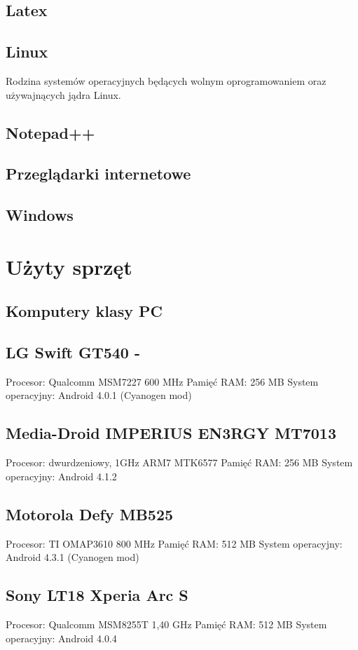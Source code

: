 \documentclass[11pt,a4paper,polish,thesis]{dcsbook}
\begin{document}
\subsection{Latex}

\subsection{Linux}
Rodzina systemów operacyjnych będących wolnym oprogramowaniem oraz używajnących jądra Linux.
\subsection{Notepad++}
\subsection{Przeglądarki internetowe}
\subsection{Windows}
\section{Użyty sprzęt}

\subsection{Komputery klasy PC}
\subsection{LG Swift GT540 - }
Procesor: Qualcomm MSM7227 600 MHz
Pamięć RAM: 256 MB
System operacyjny: Android 4.0.1 (Cyanogen mod)
\subsection{Media-Droid IMPERIUS EN3RGY MT7013}
Procesor: dwurdzeniowy, 1GHz ARM7 MTK6577
Pamięć RAM: 256 MB
System operacyjny: Android 4.1.2
\subsection{Motorola Defy MB525}
Procesor: TI OMAP3610 800 MHz
Pamięć RAM: 512 MB
System operacyjny: Android 4.3.1 (Cyanogen mod)
\subsection{Sony LT18 Xperia Arc S}
Procesor: Qualcomm MSM8255T 1,40 GHz
Pamięć RAM: 512 MB
System operacyjny: Android 4.0.4
\end{document}
